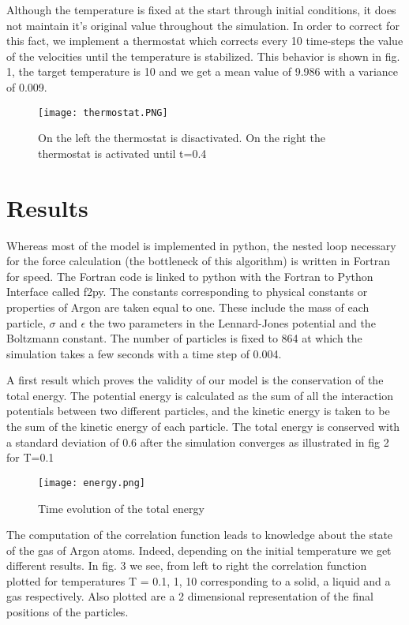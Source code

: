 \documentclass[10pt,letterpaper]{article}
\begin{document}
Although the temperature is fixed at the start through initial conditions, it does not maintain it’s original value throughout the simulation. In order to correct for this fact, we implement a thermostat which corrects every 10 time-steps the value of the velocities until the temperature is stabilized. This behavior is shown in fig. 1, the target temperature is 10 and we get a mean value of 9.986 with a variance of 0.009.

\begin{figure}[H]
\centering
\texttt{[image: thermostat.PNG]}
\caption{On the left the thermostat is disactivated. On the right the thermostat is activated until t=0.4}
\end{figure}

\section{Results}

Whereas most of the model is implemented in python, the nested loop necessary for the force calculation (the bottleneck of this algorithm) is written in Fortran for speed. The Fortran code is linked to python with the Fortran to Python Interface called f2py. The constants corresponding to physical constants or properties of Argon are taken equal to one. These include the mass of each particle, $\sigma$ and $\epsilon$ the two parameters in the Lennard-Jones potential and the Boltzmann constant. The number of particles is fixed to 864 at which the simulation takes a few seconds with a time step of 0.004.

\vspace{5mm}
A first result which proves the validity of our model is the conservation of the total energy. The potential energy is calculated as the sum of all the interaction potentials between two different particles, and the kinetic energy is taken to be the sum of the kinetic energy of each particle. The total energy is conserved with a standard deviation of  0.6 after the simulation converges as illustrated in fig 2 for T=0.1 

\begin{figure}[H]
\centering
\texttt{[image: energy.png]}
\caption{Time evolution of the total energy}
\end{figure}


The computation of the correlation function leads to knowledge about the state of the gas of Argon atoms. Indeed, depending on the initial temperature we get different results. In fig. 3 we see, from left to right the correlation function plotted for temperatures T = 0.1, 1, 10 corresponding to a solid, a liquid and a gas respectively. Also plotted are a 2 dimensional representation of the final positions of the particles.
\end{document}
